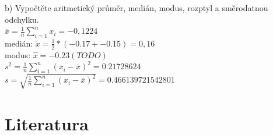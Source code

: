 \documentclass[11pt,a4paper]{article}
\begin{document}
\noindent\makebox[\linewidth]{\rule{\textwidth}{0.4pt}}

b) Vypočtěte aritmetický průměr, medián, modus, rozptyl a směrodatnou odchylku. \\

$ \overline{x} = \frac{1}{n} \sum\limits_{i=1}^n x_i = -0,1224$ \\

medián: $  \widetilde{x} = \frac{1}{2}*(-0.17 + -0.15) = 0,16 $ \\

modus: $ \widehat{x} = -0.23 (TODO) $ \\

$ s^2 = \frac{1}{n} \sum\limits_{i=1}^{n} (x_i - \overline{x})^2 = 0.21728624 $ \\

$ s = \sqrt{\frac{1}{n} \sum\limits_{i=1}^n (x_i - \overline{x})^2} = 0.466139721542801$ \\

\newpage





















\newpage

\section{Literatura}

\begin{flushleft}
    
\end{flushleft}
\end{document}
